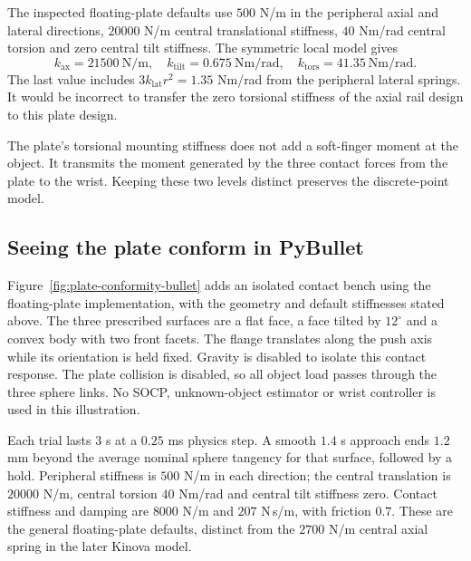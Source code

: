 The inspected floating-plate defaults use $500$ N/m in the peripheral axial and lateral directions, $20000$ N/m central translational stiffness, $40$ Nm/rad central torsion and zero central tilt stiffness. The symmetric local model gives
\begin{equation}
k_{\mathrm{ax}}=21500\ \mathrm{N/m},\quad
k_{\mathrm{tilt}}=0.675\ \mathrm{Nm/rad},\quad
k_{\mathrm{tors}}=41.35\ \mathrm{Nm/rad}.
\end{equation}
The last value includes $3k_{\mathrm{lat}}r^2=1.35$ Nm/rad from the peripheral lateral springs. It would be incorrect to transfer the zero torsional stiffness of the axial rail design to this plate design.

The plate's torsional mounting stiffness does not add a soft-finger moment at the object. It transmits the moment generated by the three contact forces from the plate to the wrist. Keeping these two levels distinct preserves the discrete-point model.

\subsection{Seeing the plate conform in PyBullet}
\label{sec:plate-visual-bench}

Figure~\ref{fig:plate-conformity-bullet} adds an isolated contact bench using the floating-plate implementation, with the geometry and default stiffnesses stated above. The three prescribed surfaces are a flat face, a face tilted by $12^\circ$ and a convex body with two front facets. The flange translates along the push axis while its orientation is held fixed. Gravity is disabled to isolate this contact response. The plate collision is disabled, so all object load passes through the three sphere links. No SOCP, unknown-object estimator or wrist controller is used in this illustration.


Each trial lasts $3$ s at a $0.25$ ms physics step. A smooth $1.4$ s approach ends $1.2$ mm beyond the average nominal sphere tangency for that surface, followed by a hold. Peripheral stiffness is $500$ N/m in each direction; the central translation is $20000$ N/m, central torsion $40$ Nm/rad and central tilt stiffness zero. Contact stiffness and damping are $8000$ N/m and $207$ N\,s/m, with friction $0.7$. These are the general floating-plate defaults, distinct from the $2700$ N/m central axial spring in the later Kinova model.

